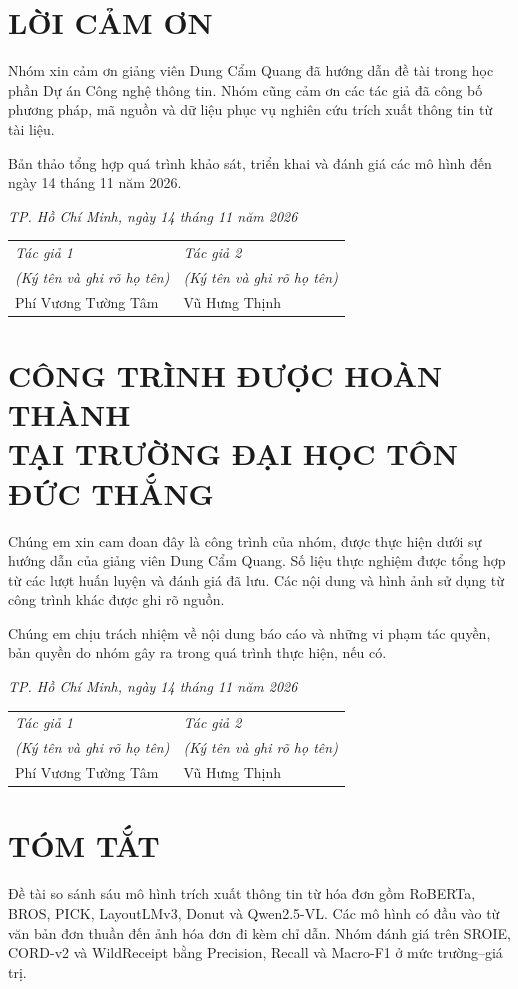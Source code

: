 \hypersetup{pageanchor=true}
\newcommand{\authorsignaturearea}{%
\begin{center}
\begin{tabular}{>{\centering\arraybackslash}m{0.46\textwidth}>{\centering\arraybackslash}m{0.46\textwidth}}
\textit{Tác giả 1} & \textit{Tác giả 2} \tabularnewline[0.15cm]
\textit{(Ký tên và ghi rõ họ tên)} & \textit{(Ký tên và ghi rõ họ tên)} \tabularnewline[1.45cm]
Phí Vương Tường Tâm & Vũ Hưng Thịnh \tabularnewline
\end{tabular}
\end{center}}
\chapter*{LỜI CẢM ƠN}
Nhóm xin cảm ơn giảng viên Dung Cẩm Quang đã hướng dẫn đề tài trong học phần Dự án Công nghệ thông tin. Nhóm cũng cảm ơn các tác giả đã công bố phương pháp, mã nguồn và dữ liệu phục vụ nghiên cứu trích xuất thông tin từ tài liệu.

Bản thảo tổng hợp quá trình khảo sát, triển khai và đánh giá các mô hình đến ngày 14 tháng 11 năm 2026.

\begin{flushright}\textit{TP. Hồ Chí Minh, ngày 14 tháng 11 năm 2026}\end{flushright}
\authorsignaturearea

\chapter*{CÔNG TRÌNH ĐƯỢC HOÀN THÀNH\\TẠI TRƯỜNG ĐẠI HỌC TÔN ĐỨC THẮNG}
Chúng em xin cam đoan đây là công trình của nhóm, được thực hiện dưới sự hướng dẫn của giảng viên Dung Cẩm Quang. Số liệu thực nghiệm được tổng hợp từ các lượt huấn luyện và đánh giá đã lưu. Các nội dung và hình ảnh sử dụng từ công trình khác được ghi rõ nguồn.

Chúng em chịu trách nhiệm về nội dung báo cáo và những vi phạm tác quyền, bản quyền do nhóm gây ra trong quá trình thực hiện, nếu có.

\begin{flushright}\textit{TP. Hồ Chí Minh, ngày 14 tháng 11 năm 2026}\end{flushright}
\authorsignaturearea

\chapter*{TÓM TẮT}
Đề tài so sánh sáu mô hình trích xuất thông tin từ hóa đơn gồm RoBERTa, BROS, PICK, LayoutLMv3, Donut và Qwen2.5-VL. Các mô hình có đầu vào từ văn bản đơn thuần đến ảnh hóa đơn đi kèm chỉ dẫn. Nhóm đánh giá trên SROIE, CORD-v2 và WildReceipt bằng Precision, Recall và Macro-F1 ở mức trường--giá trị.


